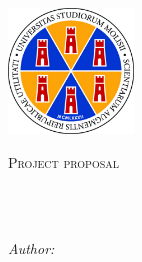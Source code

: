 \documentclass[
11pt, %
oneside, %
italian, %
onehalfspacing,%
headsepline, %
]{MastersDoctoralThesis} %
\author{Federico \textsc{Zappone}} %
\begin{document}
\renewenvironment{abstract}


\pagestyle{plain} %


\begin{titlepage}
\begin{center}

\vspace*{.06\textheight}
{\scshape\LARGE \univname\par}\vspace{0.5cm} %
{\scshape\large \deptname\par}\vspace{1cm} %

\includegraphics[width=0.25\textwidth]{images/logo.png} %
\vspace{1cm}

\textsc{\Large Project proposal}\\[0.5cm] %

\HRule\\[0.4cm] %
{\huge \bfseries \ttitle\par}\vspace{0.4cm} %
\HRule\\[1.5cm] %

\begin{center} \large
\emph{Author:}\\
\href{mailto:f.zappone1@studenti.unimol.it}{\authorname} %
\end{center}


\end{center}
\end{titlepage}
\end{document}
